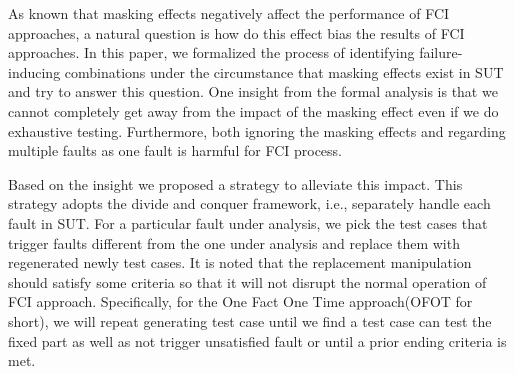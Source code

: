 \documentclass{sig-alternate}
\begin{document}

As known that masking effects negatively affect the performance of FCI approaches, a natural question is how do this effect bias the results of FCI approaches. In this paper, we formalized the process of identifying failure-inducing combinations under the circumstance that masking effects exist in SUT and try to answer this question. One insight from the formal analysis is that we cannot completely get away from the impact of the masking effect even if we do exhaustive testing. Furthermore, both ignoring the masking effects and regarding multiple faults as one fault is harmful for FCI process.

Based on the insight we proposed a strategy to alleviate this impact. This strategy adopts the divide and conquer framework, i.e., separately handle each fault in SUT. For a particular fault under analysis, we pick the test cases that trigger faults different from the one under analysis and replace them with regenerated newly test cases. It is noted that the replacement manipulation should satisfy some criteria so that it will not disrupt the normal operation of FCI approach. Specifically, for the One Fact One Time approach(OFOT for short), we will repeat generating test case until we find a test case can test the fixed part as well as not trigger unsatisfied fault or until a prior ending criteria is met.


\end{document}
